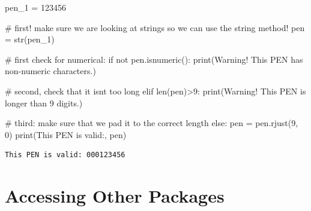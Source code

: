 \documentclass[
  letterpaper,
  DIV=11,
  numbers=noendperiod]{scrreprt}
\newenvironment{Shaded}{\begin{snugshade}}{\end{snugshade}}
\newcommand{\BuiltInTok}[1]{\textcolor[rgb]{0.00,0.23,0.31}{#1}}
\newcommand{\CommentTok}[1]{\textcolor[rgb]{0.37,0.37,0.37}{#1}}
\newcommand{\ControlFlowTok}[1]{\textcolor[rgb]{0.00,0.23,0.31}{#1}}
\newcommand{\DecValTok}[1]{\textcolor[rgb]{0.68,0.00,0.00}{#1}}
\newcommand{\KeywordTok}[1]{\textcolor[rgb]{0.00,0.23,0.31}{#1}}
\newcommand{\NormalTok}[1]{\textcolor[rgb]{0.00,0.23,0.31}{#1}}
\newcommand{\OperatorTok}[1]{\textcolor[rgb]{0.37,0.37,0.37}{#1}}
\newcommand{\StringTok}[1]{\textcolor[rgb]{0.13,0.47,0.30}{#1}}
\begin{document}
\begin{tcolorbox}[enhanced jigsaw, rightrule=.15mm, opacitybacktitle=0.6, colback=white, toprule=.15mm, colframe=quarto-callout-note-color-frame, bottomtitle=1mm, bottomrule=.15mm, arc=.35mm, coltitle=black, breakable, title={Solution to Challenge 7}, titlerule=0mm, opacityback=0, colbacktitle=quarto-callout-note-color!10!white, left=2mm, toptitle=1mm, leftrule=.75mm]

\begin{Shaded}
\begin{Highlighting}[]
\NormalTok{pen\_1 }\OperatorTok{=} \StringTok{\textquotesingle{}123456\textquotesingle{}}

\CommentTok{\# first! make sure we are looking at strings so we can use the string method!}
\NormalTok{pen }\OperatorTok{=} \BuiltInTok{str}\NormalTok{(pen\_1)}

\CommentTok{\# first check for numerical:}
\ControlFlowTok{if} \KeywordTok{not}\NormalTok{ pen.isnumeric():}
    \BuiltInTok{print}\NormalTok{(}\StringTok{\textquotesingle{}Warning! This PEN has non{-}numeric characters.\textquotesingle{}}\NormalTok{)}

\CommentTok{\# second, check that it isn\textquotesingle{}t too long}
\ControlFlowTok{elif} \BuiltInTok{len}\NormalTok{(pen)}\OperatorTok{\textgreater{}}\DecValTok{9}\NormalTok{:}
    \BuiltInTok{print}\NormalTok{(}\StringTok{\textquotesingle{}Warning! This PEN is longer than 9 digits.\textquotesingle{}}\NormalTok{)}

\CommentTok{\# third: make sure that we pad it to the correct length}
\ControlFlowTok{else}\NormalTok{:}
\NormalTok{    pen }\OperatorTok{=}\NormalTok{ pen.rjust(}\DecValTok{9}\NormalTok{, }\StringTok{\textquotesingle{}0\textquotesingle{}}\NormalTok{)}
    \BuiltInTok{print}\NormalTok{(}\StringTok{\textquotesingle{}This PEN is valid:\textquotesingle{}}\NormalTok{, pen)}
\end{Highlighting}
\end{Shaded}

\begin{verbatim}
This PEN is valid: 000123456
\end{verbatim}

\end{tcolorbox}

\hypertarget{accessing-other-packages}{%
\section{Accessing Other Packages}\label{accessing-other-packages}}
\end{document}
